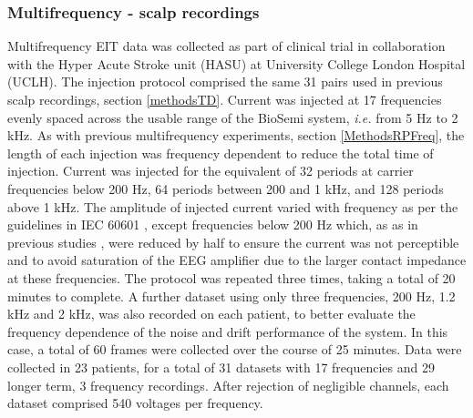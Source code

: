\subsubsection{Multifrequency - scalp recordings}

Multifrequency EIT data was collected as part of clinical trial in collaboration with the Hyper Acute Stroke unit (HASU) at University College London Hospital (UCLH). The injection protocol comprised the same 31 pairs used in previous scalp recordings, section \ref{methodsTD}.  Current was injected at 17 frequencies evenly spaced across the usable range of the BioSemi system, \emph{i.e.} from 5 Hz to 2 kHz. As with previous multifrequency experiments, section \ref{MethodsRPFreq}, the length of each injection was frequency dependent to reduce the total time of injection. Current was injected for the equivalent of 32 periods at carrier frequencies below 200 Hz, 64 periods between 200 and 1 kHz, and 128 periods above 1 kHz. The amplitude of injected current varied with frequency as per the guidelines in IEC 60601 \cite{IEC}, except frequencies below 200 Hz which, as as in previous studies \cite{McEwan_2006}, were reduced by half to ensure the current was not perceptible and to avoid saturation of the EEG amplifier due to the larger contact impedance at these frequencies. The protocol was repeated three times, taking a total of 20 minutes to complete. A further dataset using only three frequencies, 200 Hz, 1.2 kHz and 2 kHz, was also recorded on each patient, to better evaluate the frequency dependence of the noise and drift performance of the system. In this case, a total of 60 frames were collected over the course of 25 minutes. Data were collected in 23 patients, for a total of 31 datasets with 17 frequencies and 29 longer term, 3 frequency recordings. After rejection of negligible channels, each dataset comprised 540 voltages per frequency.  